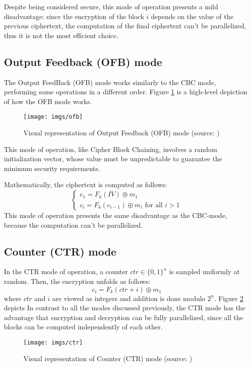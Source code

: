 \documentclass[target=mst,aauheader=aics]{thud}
\theoremstyle{definition}
\begin{document}
Despite being considered secure, this mode of operation presents a mild disadvantage: since the encryption of the block $i$ depends on the value of the previous ciphertext, the computation of the final ciphertext can't be parallelized, thus it is not the most efficient choice.
\subsection{Output Feedback (OFB) mode}
The Output FeedBack (OFB) mode works similarly to the CBC mode, performing some operations in a different order. Figure \ref{fig:ofb} is a high-level depiction of how the OFB mode works.
\begin{figure}[!h]
	\centering
	\texttt{[image: imgs/ofb]}
	\captionsetup{width=.7\linewidth}
	\caption{Visual representation of Output Feedback (OFB) mode (source: \cite{Katz2007})}
	\label{fig:ofb}
\end{figure}
This mode of operation, like Cipher Block Chaining, involves a random initialization vector, whose value must be unpredictable to guarantee the minimum security requirements.

Mathematically, the ciphertext is computed as follows:
\[
\begin{cases}
	c_1 = F_k(IV) \oplus m_1\\
	c_i = F_k(c_{i-1}) \oplus m_i \text{ for all } i>1
\end{cases}
\]
This mode of operation presents the same disadvantage as the CBC-mode, because the computation can't be parallelized.
\subsection{Counter (CTR) mode}
In the CTR mode of operation, a counter $ctr \in \{0,1\}^n$ is sampled uniformly at random. Then, the encryption unfolds as follows:
\[
c_i = F_k(ctr + i) \oplus m_1
\]
where $ctr$ and $i$ are viewed as integers and addition is done modulo $2^n$. Figure \ref{fig:ctr} depicts In contrast to all the modes discussed previously, the CTR mode has the advantage that encryption and decryption can be fully parallelized, since all the blocks can be computed independently of each other.
\begin{figure}[!h]
	\centering
	\texttt{[image: imgs/ctr]}
	\captionsetup{width=.7\linewidth}
	\caption{Visual representation of Counter (CTR) mode (source: \cite{Katz2007})}
	\label{fig:ctr}
\end{figure}
\end{document}
